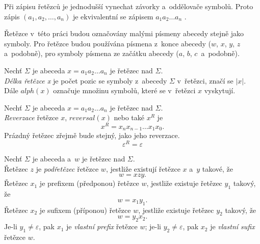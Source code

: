 \begin{convention}
    Při zápisu řetězců je jednodušší vynechat závorky a~oddělovače symbolů.
    Proto zápis $(a_1, a_2, \ldots, a_n)$ je ekvivalentní se zápisem $a_1a_2\ldots a_n$ \cite{meduna2014formal}.
    
    Řetězce v~této práci budou označovány malými písmeny abecedy stejně jako symboly.
    Pro řetězce budou používána písmena z~konce abecedy ($w$, $x$, $y$, $z\,$ a~podobně), pro symboly písmena ze začátku abecedy ($a$, $b$, $c\,$ a~podobně).
\end{convention}

\begin{definition}
    Nechť $\Sigma$ je abeceda $x = a_1a_2\ldots a_n$ je řetězec nad $\Sigma$.\\
    \emph{Délka řetězce x} je počet pozic se symboly z~abecedy $\Sigma$ v~řetězci, značí se $|x|$.
    Dále $alph(x)$ označuje množinu symbolů, které se v~řetězci $x$ vyskytují.
\end{definition}

\begin{definition}
    Nechť $\Sigma$ je abeceda $x = a_1a_2\ldots a_n$ je řetězec nad $\Sigma$.\\
    \emph{Reverzace} řetězce $x$, $reversal(x)$ nebo také $x^R$ je
    \begin{equation*}
        x^R = x_nx_{n-1}\ldots x_1x_0.
    \end{equation*} 
    Prázdný řetězec zřejmě bude stejný, jako jeho reverzace.
    \begin{equation*}
        \varepsilon^R = \varepsilon
    \end{equation*}
\end{definition}

\begin{definition}
    Nechť $\Sigma$ je abeceda a~$w$ je řetězec nad $\Sigma$.\\
    Řetězec $z$ je \emph{podřetězec} řetězce $w$, jestliže existují řetězce $x$ a~$y$ takové, že
    \begin{equation*}
        w = xzy.
    \end{equation*}
    Řetězec $x_1$ je prefixem (předponou) řetězce $w$, jestliže existuje řetězec $y_1$ takový, že
    \begin{equation*}
        w = x_1y_1.
    \end{equation*}
    Řetězec $x_2$ je sufixem (příponou) řetězce $w$, jestliže existuje řetězec $y_2$ takový, že
    \begin{equation*}
        w = y_2x_2.
    \end{equation*}
    Je-li $y_1 \neq \varepsilon$, pak $x_1$ je \emph{vlastní prefix} řetězce $w$; je-li $y_2 \neq \varepsilon$, pak $x_2$ je \emph{vlastní sufix} řetězce $w$.
\end{definition}


